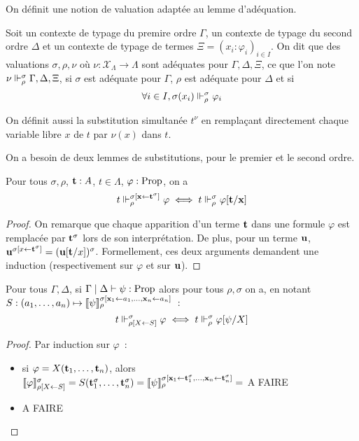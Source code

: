 \documentclass{article}
\begin{document}
On définit une notion de valuation adaptée au lemme d'adéquation.

\begin{defi}
  Soit un contexte de typage du premire ordre $\Gamma$, un contexte de typage du second ordre $\Delta$ et un contexte de typage de termes $\Xi = (x_i : \varphi_i)_{i\in I}$. On dit que des valuations $\sigma, \rho, \nu$ où $\nu : \mathcal X_\Lambda \to \Lambda$ sont adéquates pour $\Gamma,\Delta,\Xi$, ce que l'on note $\nu\Vdash_\rho^\sigma \Gamma,\Delta,\Xi$, si $\sigma$ est adéquate pour $\Gamma$, $\rho$ est adéquate pour $\Delta$ et si
  \[\forall i \in I, \sigma(x_i)\Vdash_\rho^\sigma\varphi_i\]
\end{defi}

On définit aussi la substitution simultanée $t^\nu$ en remplaçant directement chaque variable libre $x$ de $t$ par $\nu(x)$ dans $t$.

On a besoin de deux lemmes de substitutions, pour le premier et le second ordre.

\begin{lem}
  Pour tous $\sigma,\rho$, $\mathbf{t} : A$, $t\in\Lambda$, $\varphi : \mathrm{Prop}$, on a
  \[t\Vdash_\rho^{\sigma[\mathbf{x} \leftarrow \mathbf{t}^\sigma]} \varphi\iff t\Vdash_\rho^\sigma \varphi[\mathbf{t}/\mathbf{x}]\]
\end{lem}

\begin{proof}
  On remarque que chaque apparition d'un terme $\mathbf{t}$ dans une formule $\varphi$ est remplacée par $\mathbf{t}^\sigma$ lors de son interprétation. De plus, pour un terme $\mathbf{u}$, $\mathbf{u}^{\sigma[x\leftarrow \mathbf{t}^\sigma]} = (\mathbf{u}[\mathbf{t}/x])^\sigma$. Formellement, ces deux arguments demandent une induction (respectivement sur $\varphi$ et sur $\mathbf{u}$).
\end{proof}

\begin{lem}
  Pour tous $\Gamma,\Delta$, si $\Gamma\mid\Delta\vdash \psi : \mathrm{Prop}$ alors pour tous $\rho,\sigma$ on a, en notant $S : (a_1,\ldots,a_n) \mapsto \llbracket \psi \rrbracket_\rho^{\sigma[\mathbf{x}_1\leftarrow a_1,\ldots,\mathbf{x}_n\leftarrow a_n]}$~:
  \[t\Vdash_{\rho[X\leftarrow S]}^\sigma \varphi \iff t\Vdash_\rho^\sigma \varphi[\psi/X]\]
\end{lem}

\begin{proof}
  Par induction sur $\varphi$~:
  \begin{itemize}
  \item si $\varphi = X(\mathbf{t}_1,\ldots,\mathbf{t}_n)$, alors $\llbracket \varphi \rrbracket_{\rho[X\leftarrow S]}^\sigma = S(\mathbf{t}_1^\sigma,\ldots,\mathbf{t}_n^\sigma) = \llbracket \psi \rrbracket_\rho^{\sigma[\mathbf{x}_1\leftarrow \mathbf{t}_1^\sigma,\ldots,\mathbf{x}_n\leftarrow \mathbf{t}_n^\sigma]} = $ A FAIRE
  \item A FAIRE
  \end{itemize}
\end{proof}
\end{document}
